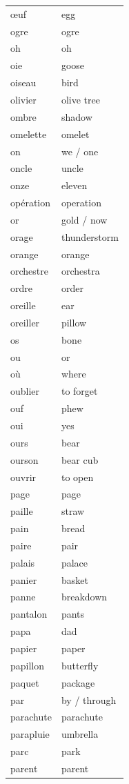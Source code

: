 \documentclass[12pt,a4paper]{article}
\begin{document}
\begin{longtable}{p{4cm} p{6cm}}
œuf & egg \\
ogre & ogre \\
oh & oh \\
oie & goose \\
oiseau & bird \\
olivier & olive tree \\
ombre & shadow \\
omelette & omelet \\
on & we / one \\
oncle & uncle \\
onze & eleven \\
opération & operation \\
or & gold / now \\
orage & thunderstorm \\
orange & orange \\
orchestre & orchestra \\
ordre & order \\
oreille & ear \\
oreiller & pillow \\
os & bone \\
ou & or \\
où & where \\
oublier & to forget \\
ouf & phew \\
oui & yes \\
ours & bear \\
ourson & bear cub \\
ouvrir & to open \\
page & page \\
paille & straw \\
pain & bread \\
paire & pair \\
palais & palace \\
panier & basket \\
panne & breakdown \\
pantalon & pants \\
papa & dad \\
papier & paper \\
papillon & butterfly \\
paquet & package \\
par & by / through \\
parachute & parachute \\
parapluie & umbrella \\
parc & park \\
parent & parent \\

\end{longtable}
\end{document}

